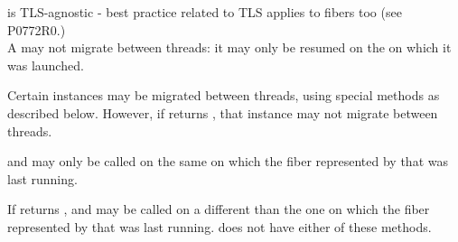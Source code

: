 
\fiber is TLS-agnostic - best practice related to TLS applies to fibers too
(see P0772R0.)\\

A \fiber may not migrate between threads: it may only be resumed on the
\thread on which it was launched.

Certain \xtfiber instances may be migrated between threads, using special
methods as described below. However, if \anythread returns , that
instance may not migrate between threads.

and  may only be called on
the same \thread on which the fiber represented by that \xtfiber was last
running.

If \anythread
returns , 
and  may be
called on a different \thread than the one on which the fiber represented by
that \xtfiber was last running. \fiber does not have either of these methods.
